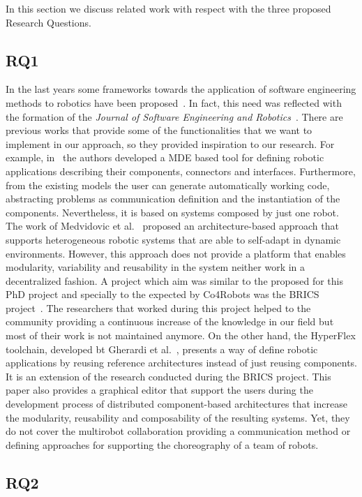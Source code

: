 In this section we discuss related work with respect with the three proposed Research Questions.

\subsection{RQ1}

In the last years some frameworks towards the application of software engineering methods to robotics have been proposed~\cite{Ramaswamy2014}.
In fact, this need was reflected with the formation of the \emph{Journal of Software Engineering and Robotics}~\cite{Brugali2010_journal}.
There are previous works that provide some of the functionalities that we want to implement in our approach, so they provided inspiration to our research.
For example, in~\cite{wenger} the authors developed a MDE based tool for defining robotic applications describing their components, connectors and interfaces.
Furthermore, from the existing models the user can generate automatically working code, abstracting problems as communication definition and the instantiation of the components.
Nevertheless, it is based on systems composed by just one robot.
The work of Medvidovic et al.~\cite{medvidovic} proposed an architecture-based approach that supports heterogeneous robotic systems that are able to self-adapt in dynamic environments.
However, this approach does not provide a platform that enables modularity, variability and reusability in the system neither work in a decentralized fashion.
A project which aim was similar to the proposed for this PhD project and specially to the expected by Co4Robots was the BRICS project~\cite{Bischoff2010}. 
The researchers that worked during this project helped to the community providing a continuous increase of the knowledge in our field but most of their work is not maintained anymore.
On the other hand, the HyperFlex toolchain, developed bt Gherardi et al.~\cite{gherardi}, presents a way of define robotic applications by reusing reference architectures instead of just reusing components.
It is an extension of the research conducted during the BRICS project.
This paper also provides a graphical editor that support the users during the development process of distributed component-based architectures that increase the modularity, reusability and composability of the resulting systems.
Yet, they do not cover the multirobot collaboration providing a communication method or defining approaches for supporting the choreography of a team of robots.

\subsection{RQ2}

